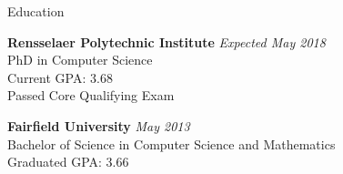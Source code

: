 \documentclass{resume} %
\begin{document}

\begin{rSection}{Education}

{\bf Rensselaer Polytechnic Institute} \hfill {\em Expected May 2018} \\ 
PhD in Computer Science\\
Current GPA: 3.68 \\
\small{Passed Core Qualifying Exam}


{\bf Fairfield University} \hfill {\em May 2013} \\ 
Bachelor of Science in Computer Science and Mathematics\\
Graduated GPA: 3.66

\end{rSection}
\end{document}

